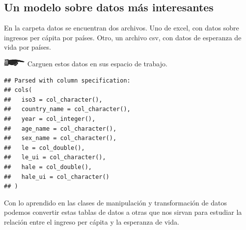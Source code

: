\documentclass[]{book}
\newenvironment{Shaded}{\begin{snugshade}}{\end{snugshade}}
\newcommand{\KeywordTok}[1]{\textcolor[rgb]{0.13,0.29,0.53}{\textbf{#1}}}
\newcommand{\DecValTok}[1]{\textcolor[rgb]{0.00,0.00,0.81}{#1}}
\newcommand{\StringTok}[1]{\textcolor[rgb]{0.31,0.60,0.02}{#1}}
\newcommand{\CommentTok}[1]{\textcolor[rgb]{0.56,0.35,0.01}{\textit{#1}}}
\newcommand{\OperatorTok}[1]{\textcolor[rgb]{0.81,0.36,0.00}{\textbf{#1}}}
\newcommand{\NormalTok}[1]{#1}
\theoremstyle{definition}
\theoremstyle{definition}
\theoremstyle{definition}
\theoremstyle{remark}
\begin{document}
\subsection{Un modelo sobre datos más
interesantes}\label{un-modelo-sobre-datos-mas-interesantes}

En la carpeta datos se encuentran dos archivos. Uno de excel, con datos
sobre ingresos per cápita por países. Otro, un archivo csv, con datos de
esperanza de vida por países.

\includegraphics{./imagenes/manicule2.jpg} Carguen estos datos en sus
espacio de trabajo.

\begin{verbatim}
## Parsed with column specification:
## cols(
##   iso3 = col_character(),
##   country_name = col_character(),
##   year = col_integer(),
##   age_name = col_character(),
##   sex_name = col_character(),
##   le = col_double(),
##   le_ui = col_character(),
##   hale = col_double(),
##   hale_ui = col_character()
## )
\end{verbatim}

Con lo aprendido en las clases de manipulación y transformación de datos
podemos convertir estas tablas de datos a otras que nos sirvan para
estudiar la relación entre el ingreso per cápita y la esperanza de vida.

\begin{Shaded}
\end{Shaded}
\end{document}
